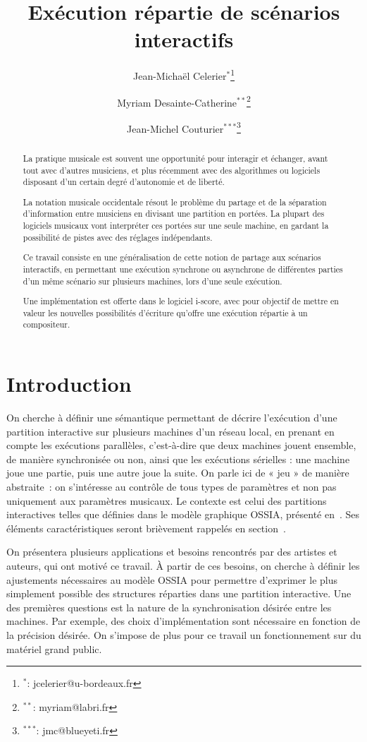 \documentclass[10pt]{article}
\title{Exécution répartie de scénarios interactifs}
\author[1,2]{Jean-Michaël Celerier$^*$\thanks{$^*$: jcelerier@u-bordeaux.fr}}
\author[1]{Myriam Desainte-Catherine$^{**}$\thanks{$^{**}$: myriam@labri.fr}}
\author[2]{Jean-Michel Couturier$^{***}$\thanks{$^{***}$: jmc@blueyeti.fr}}
\affil[1]{Univ. Bordeaux, LaBRI, UMR 5800, F-33400 Talence, France}
\affil[2]{ Blue Yeti, F-17110 France}
\newcommand\ossia{OSSIA\xspace}
\begin{document}
\maketitle
\begin{abstract}
La pratique musicale est souvent une opportunité pour interagir et échanger, avant tout avec d'autres musiciens, et plus récemment avec des algorithmes ou logiciels disposant d'un certain degré d'autonomie et de liberté.

La notation musicale occidentale résout le problème du partage et de la séparation d'information entre musiciens en divisant une partition en portées. 
La plupart des logiciels musicaux vont interpréter ces portées sur une seule machine, en gardant la possibilité de pistes avec des réglages indépendants. 

Ce travail consiste en une généralisation de cette notion de partage aux scénarios interactifs, en permettant une exécution synchrone ou asynchrone de différentes parties d'un même scénario sur plusieurs machines, lors d'une seule exécution.

Une implémentation est offerte dans le logiciel i-score, avec pour objectif de mettre en valeur les nouvelles possibilités d'écriture qu'offre une exécution répartie à un compositeur.
\end{abstract}

\section{Introduction}
On cherche à définir une sémantique permettant de décrire l'exécution d'une partition interactive sur plusieurs machines d'un réseau local, en prenant en compte les exécutions parallèles, c'est-à-dire que deux machines jouent ensemble, de manière synchronisée ou non, ainsi que les exécutions sérielles : une machine joue une partie, puis une autre joue la suite.
On parle ici de « jeu » de manière abstraite~: on s'intéresse au contrôle de tous types de paramètres et non pas uniquement aux paramètres musicaux.
Le contexte est celui des partitions interactives telles que définies dans le modèle graphique \ossia, présenté en~\cite{celerier2015ossia}. 
Ses éléments caractéristiques seront brièvement rappelés en section~\cite{sec.rappel-ossia}.

On présentera plusieurs applications et besoins rencontrés par des artistes et auteurs, qui ont motivé ce travail.
À partir de ces besoins, on cherche à définir les ajustements nécessaires au modèle \ossia pour permettre d'exprimer le plus simplement possible des structures réparties dans une partition interactive.
Une des premières questions est la nature de la synchronisation désirée entre les machines.
Par exemple, des choix d'implémentation sont nécessaire en fonction de la précision désirée. 
On s'impose de plus pour ce travail un fonctionnement sur du matériel grand public.
\end{document}
